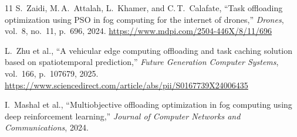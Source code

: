 \documentclass[12pt,a4paper]{article}
\begin{document}
\begin{thebibliography}{11}
S.~Zaidi, M.\,A.~Attalah, L.~Khamer, and C.\,T.~Calafate,
``Task offloading optimization using {PSO} in fog computing for the internet
  of drones,''
\textit{Drones}, vol.~8, no.~11, p.~696, 2024.
\newblock \url{https://www.mdpi.com/2504-446X/8/11/696}

L.~Zhu et al.,
``A vehicular edge computing offloading and task caching solution based on
  spatiotemporal prediction,''
\textit{Future Generation Computer Systems}, vol.~166, p.~107679, 2025.
\newblock \url{https://www.sciencedirect.com/article/abs/pii/S0167739X24006435}

I.~Mashal et al.,
``Multiobjective offloading optimization in fog computing using deep
  reinforcement learning,''
\textit{Journal of Computer Networks and Communications}, 2024.

\end{thebibliography}
\end{document}
